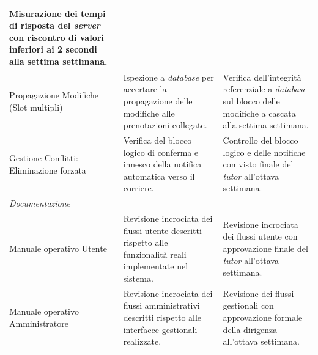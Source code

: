 {\begin{longtable}{p{} p{} p{}}
    Misurazione dei tempi di risposta del \textit{server} con riscontro di valori inferiori ai 2 secondi alla settima settimana. \\
    \hline
    Propagazione Modifiche (Slot multipli) &
    Ispezione a \textit{database} per accertare la propagazione delle modifiche alle prenotazioni collegate. & 
    Verifica dell'integrità referenziale a \textit{database} sul blocco delle modifiche a cascata alla settima settimana. \\
    \hline
    Gestione Conflitti: Eliminazione forzata &
    Verifica del blocco logico di conferma e innesco della notifica automatica verso il corriere. & 
    Controllo del blocco logico e delle notifiche con visto finale del \textit{tutor} all'ottava settimana. \\
    \hline
    \multicolumn{3}{l}{\textit{Documentazione}} \\
    \hline
    Manuale operativo Utente &
    Revisione incrociata dei flussi utente descritti rispetto alle funzionalità reali implementate nel sistema. & 
    Revisione incrociata dei flussi utente con approvazione finale del \textit{tutor} all'ottava settimana. \\
    \hline
    Manuale operativo Amministratore &
    Revisione incrociata dei flussi amministrativi descritti rispetto alle interfacce gestionali realizzate. & 
    Revisione dei flussi gestionali con approvazione formale della dirigenza all'ottava settimana. \\
\end{longtable}
}
\normalsize